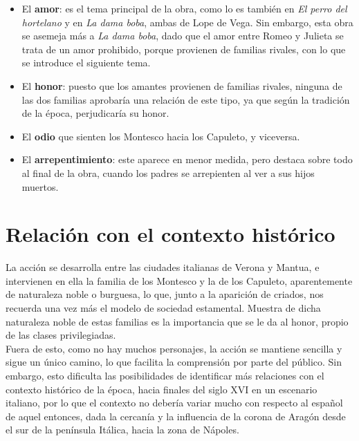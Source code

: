\documentclass[12pt,a4paper]{article}
\begin{document}
\begin{itemize}
	\item El \textbf{amor}: es el tema principal de la obra, como lo es también en \textit{El perro del hortelano} y en \textit{La dama boba}, ambas de Lope de Vega. Sin embargo, esta obra se asemeja más a \textit{La dama boba}, dado que el amor entre Romeo y Julieta se trata de un amor prohibido, porque provienen de familias rivales, con lo que se introduce el siguiente tema.
	\item El \textbf{honor}: puesto que los amantes provienen de familias rivales, ninguna de las dos familias aprobaría una relación de este tipo, ya que según la tradición de la época, perjudicaría su honor.
	\item El \textbf{odio} que sienten los Montesco hacia los Capuleto, y viceversa.
	\item El \textbf{arrepentimiento}: este aparece en menor medida, pero destaca sobre todo al final de la obra, cuando los padres se arrepienten al ver a sus hijos muertos.
\end{itemize}

\section{Relación con el contexto histórico}

La acción se desarrolla entre las ciudades italianas de Verona y Mantua, e intervienen en ella la familia de los Montesco y la de los Capuleto, aparentemente de naturaleza noble o burguesa, lo que, junto a la aparición de criados, nos recuerda una vez más el modelo de sociedad estamental. Muestra de dicha naturaleza noble de estas familias es la importancia que se le da al honor, propio de las clases privilegiadas.\\

Fuera de esto, como no hay muchos personajes, la acción se mantiene sencilla y sigue un único camino, lo que facilita la comprensión por parte del público. Sin embargo, esto dificulta las posibilidades de identificar más relaciones con el contexto histórico de la época, hacia finales del siglo XVI en un escenario italiano, por lo que el contexto no debería variar mucho con respecto al español de aquel entonces, dada la cercanía y la influencia de la corona de Aragón desde el sur de la península Itálica, hacia la zona de Nápoles.
\end{document}
